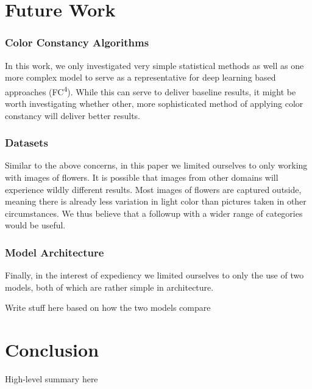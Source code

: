 \section{Future Work}

\subsubsection{Color Constancy Algorithms}

In this work, we only investigated very simple statistical methods as well as one more complex model to serve as a representative
for deep learning based approaches (FC\textsuperscript{4}). While this can serve to deliver baseline results, it might be worth investigating
whether other, more sophisticated method of applying color constancy will deliver better results.

\subsubsection{Datasets}

Similar to the above concerns, in this paper we limited ourselves to only working with images of flowers. It is possible that images from 
other domains will experience wildly different results. Most images of flowers are captured outside, meaning there is already less variation in
light color than pictures taken in other circumstances. We thus believe that a followup with a wider range of categories would be useful.

\subsubsection{Model Architecture}

Finally, in the interest of expediency we limited ourselves to only the use of two models, both of which are rather simple in architecture.

{\color{red}Write stuff here based on how the two models compare}

\section{Conclusion}

{\color{red}High-level summary here}